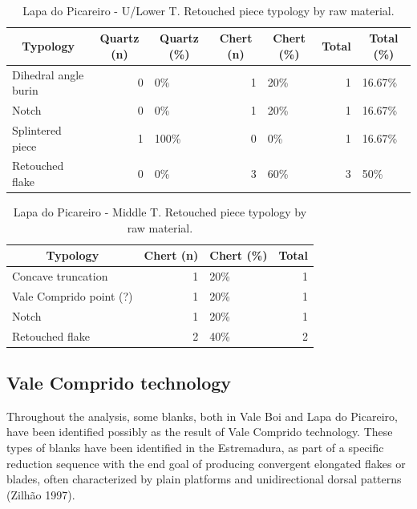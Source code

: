 \documentclass[12pt,twoside]{reedthesis}
\begin{document}
~
\begin{table}[!h]

\caption{\label{tab:retouchLP1}Lapa do Picareiro - U/Lower T. Retouched piece typology by raw material.}
\centering
\fontsize{9}{11}\selectfont
\begin{tabular}[t]{lrlrlrl}
\toprule
\multicolumn{1}{c}{\textbf{Typology}} & \multicolumn{1}{c}{\textbf{Quartz (n)}} & \multicolumn{1}{c}{\textbf{Quartz (\%)}} & \multicolumn{1}{c}{\textbf{Chert (n)}} & \multicolumn{1}{c}{\textbf{Chert (\%)}} & \multicolumn{1}{c}{\textbf{Total}} & \multicolumn{1}{c}{\textbf{Total (\%)}}\\
\midrule
Dihedral angle burin & 0 & 0\% & 1 & 20\% & 1 & 16.67\%\\
Notch & 0 & 0\% & 1 & 20\% & 1 & 16.67\%\\
Splintered piece & 1 & 100\% & 0 & 0\% & 1 & 16.67\%\\
Retouched flake & 0 & 0\% & 3 & 60\% & 3 & 50\%\\
\bottomrule
\end{tabular}
\end{table}
\begin{table}[!h]

\caption{\label{tab:retouchLP2}Lapa do Picareiro - Middle T. Retouched piece typology by raw material.}
\centering
\fontsize{9}{11}\selectfont
\begin{tabular}[t]{lrlr}
\toprule
\multicolumn{1}{c}{\textbf{Typology}} & \multicolumn{1}{c}{\textbf{Chert (n)}} & \multicolumn{1}{c}{\textbf{Chert (\%)}} & \multicolumn{1}{c}{\textbf{Total}}\\
\midrule
Concave truncation & 1 & 20\% & 1\\
Vale Comprido point (?) & 1 & 20\% & 1\\
Notch & 1 & 20\% & 1\\
Retouched flake & 2 & 40\% & 2\\
\bottomrule
\end{tabular}
\end{table}
\hypertarget{vale-comprido-technology}{%
\subsection{Vale Comprido technology}\label{vale-comprido-technology}}

Throughout the analysis, some blanks, both in Vale Boi and Lapa do Picareiro, have been identified possibly as the result of Vale Comprido technology. These types of blanks have been identified in the Estremadura, as part of a specific reduction sequence with the end goal of producing convergent elongated flakes or blades, often characterized by plain platforms and unidirectional dorsal patterns (Zilhão 1997).
\end{document}
